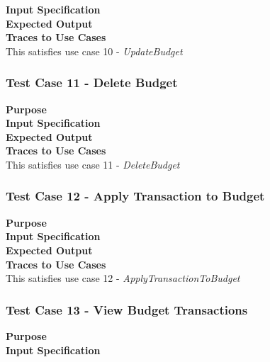 \documentclass[12pt]{article}
\begin{document}
\noindent
{\bf Input Specification}\\

\noindent
{\bf Expected Output}\\

\noindent
{\bf Traces to Use Cases}\\
This satisfies use case 10 - \textit{UpdateBudget}

\clearpage %
\subsubsection{Test Case 11 - Delete Budget} \label{TC-11}
\noindent
{\bf Purpose}\\
                                                        
\noindent
{\bf Input Specification}\\

\noindent
{\bf Expected Output}\\

\noindent
{\bf Traces to Use Cases}\\
This satisfies use case 11 - \textit{DeleteBudget}

\subsubsection{Test Case 12 - Apply Transaction to Budget} \label{TC-12}
\noindent
{\bf Purpose}\\
                                                        
\noindent
{\bf Input Specification}\\

\noindent
{\bf Expected Output}\\

\noindent
{\bf Traces to Use Cases}\\
This satisfies use case 12 - \textit{ApplyTransactionToBudget}

\clearpage %
\subsubsection{Test Case 13 - View Budget Transactions} \label{TC-13}
\noindent
{\bf Purpose}\\
                                                        
\noindent
{\bf Input Specification}\\
\end{document}
